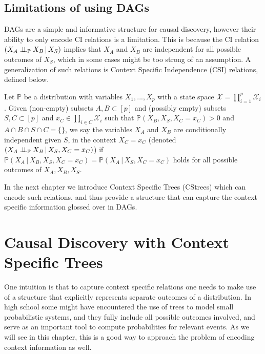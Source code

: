 \documentclass{tufte-book}
\begin{document}
\section{Limitations of using DAGs}
\label{sec:orga8f4d67}
DAGs are a simple and informative structure for causal discovery, however their ability to only encode CI relations is a limitation. This is because the CI relation  \((X_A \perp \!\!\! \perp_{\mathbb{P}} X_B \,|\, X_S)\) implies that \(X_A\) and \(X_B\) are independent for all possible outcomes of \(X_S\), which in some cases might be too strong of an assumption. A generalization of such relations is Context Specific Independence (CSI) relations, defined below.
\begin{definition}\label{def:csirel}
Let  $\mathbb{P}$ be a distribution with variables $X_1,...,X_p$ with a state space $\mathcal{X} = \prod_{i=1}^p \mathcal{X}_i$. Given (non-empty) subsets $A,B \subset [p]$ and (possibly empty) subsets $S,C \subset [p]$ and $x_C \in \prod_{i \in C}\mathcal{X}_i $ such that $\mathbb{P}(X_B, X_S, X_C = x_C)>0$ and $A \cap B \cap S \cap C = \{\}$, we say the variables $X_A$ and $X_B$ are conditionally independent given $S$, in the context $X_C=x_C$ (denoted $(X_A\perp \!\!\! \perp_{\mathbb{P}} X_B \,|\, X_S, X_C=x_C)$) if $\mathbb{P}(X_A \,|\,X_B, X_S,X_C=x_C) = \mathbb{P}(X_A \, |\, X_S,X_C=x_C)$ holds for all possible outcomes of $X_A,X_B,X_S$.
\end{definition}


In the next chapter we introduce Context Specific Trees (CStrees) which can encode such relations, and thus provide a structure that can capture the context specific information glossed over in DAGs.


 \newpage 

\chapter{Causal Discovery with Context Specific Trees}
\label{sec:org5d29239}
One intuition is that to capture context specific relations one needs to make use of a structure that explicitly represents separate outcomes of a distribution. In high school some might have encountered the use of trees to model small probabilistic systems, and they fully include all possible outcomes involved, and serve as an important tool to compute probabilities for relevant events. As we will see in this chapter, this is a good way to approach the problem of encoding context information as well.
\end{document}
